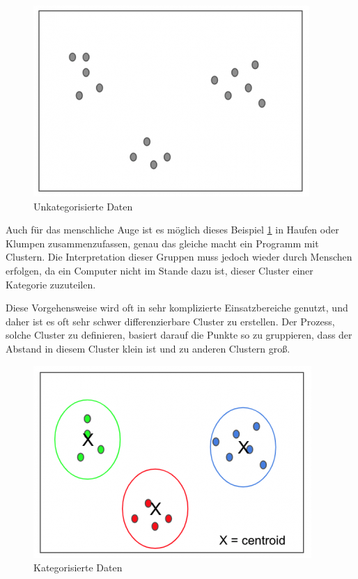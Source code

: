\begin{figure}[ht]
    \centering
    \includegraphics[scale=0.8]{sections/machine-learning/images/unclustered-data.png}
    \caption{Unkategorisierte Daten}
    \label{fig:unclustered-data}
\end{figure}

Auch für das menschliche Auge ist es möglich dieses Beispiel \ref{fig:unclustered-data} in Haufen oder Klumpen zusammenzufassen, genau das gleiche macht ein Programm mit Clustern. Die Interpretation dieser Gruppen muss jedoch wieder durch Menschen erfolgen, da ein Computer nicht im Stande dazu ist, dieser Cluster einer Kategorie zuzuteilen.

Diese Vorgehensweise wird oft in sehr komplizierte Einsatzbereiche genutzt, und daher ist es oft sehr schwer differenzierbare Cluster zu erstellen. Der Prozess, solche Cluster zu definieren, basiert darauf die Punkte so zu gruppieren, dass der Abstand in diesem Cluster klein ist und zu anderen Clustern groß.

\begin{figure}[ht]
    \centering
    \includegraphics[scale=0.8]{sections/machine-learning/images/clustered-data.png}
    \caption{Kategorisierte Daten}
    \label{fig:clustered-data}
\end{figure}

